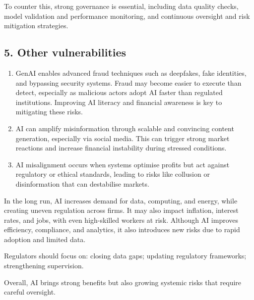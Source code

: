 To counter this, strong governance is essential, including data quality checks, model
validation and performance monitoring, and continuous oversight and risk mitigation
strategies.

\subsection*{5. Other vulnerabilities}

\begin{enumerate}
\item {} GenAI enables advanced fraud techniques such as deepfakes, fake
identities, and bypassing security systems. Fraud may become easier to execute than detect,
especially as malicious actors adopt AI faster than regulated institutions. Improving AI
literacy and financial awareness is key to mitigating these risks.
\item {} AI can amplify misinformation through scalable and convincing
content generation, especially via social media. This can trigger strong market reactions and
increase financial instability during stressed conditions.
\item {} AI misalignment occurs when systems optimise profits but act
against regulatory or ethical standards, leading to risks like collusion or disinformation
that can destabilise markets.
\end{enumerate}

\begin{cikeybox}[title={Closing position of the reading}]
In the long run, AI increases demand for data, computing, and energy, while creating uneven
regulation across firms. It may also impact inflation, interest rates, and jobs, with even
high-skilled workers at risk. Although AI improves efficiency, compliance, and analytics, it
also introduces new risks due to rapid adoption and limited data.\par\vspace{4pt}
Regulators should focus on: closing data gaps; updating regulatory frameworks; strengthening
supervision.\par\vspace{4pt}
Overall, AI brings strong benefits but also growing systemic risks that require careful
oversight.
\end{cikeybox}
